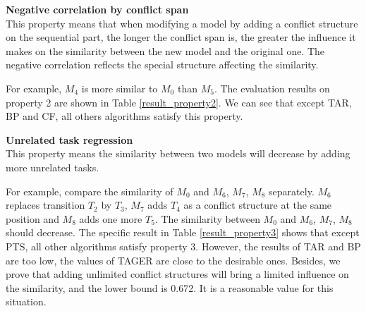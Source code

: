 \documentclass{llncs}
\begin{document}
\begin{property}
\textbf{Negative correlation by conflict span}\\
This property means that when modifying a model by adding a conflict structure on the sequential part, the longer the conflict span is, the greater the influence it makes on the similarity between the new model and the original one. The negative correlation reflects the special structure affecting the similarity.
\end{property}
For example, $M_{4}$ is more similar to $M_{0}$ than $M_{5}$. The evaluation results on property 2 are shown in Table \ref{result_property2}. We can see that except TAR, BP and CF, all others algorithms satisfy this property.

\begin{property}
\textbf{Unrelated task regression}\\ 
This property means the similarity between two models will decrease by adding more unrelated tasks.
\end{property} 
For example, compare the similarity of $M_{0}$ and $M_{6}$, $M_{7}$, $M_{8}$ separately. $M_{6}$ replaces transition $T_{2}$ by $T_{3}$, $M_{7}$ adds $T_{4}$ as a conflict structure at the same position and $M_{8}$ adds one more $T_{5}$. The similarity between $M_{0}$ and $M_{6}$, $M_{7}$, $M_{8}$ should decrease. The specific result in Table \ref{result_property3} shows that except PTS, all other algorithms satisfy property 3. However, the results of TAR and BP are too low, the values of TAGER are close to the desirable ones.
Besides, we prove that adding unlimited conflict structures will bring a limited influence on the similarity, and the lower bound is 0.672. It is a reasonable value for this situation.
\end{document}
